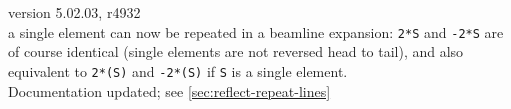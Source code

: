 \begin{madlist}
  
   version 5.02.03, r4932 \\
  a single element can now be repeated in a beamline expansion:
  \texttt{2*S} and \texttt{-2*S} are of course identical (single
  elements are not reversed head to tail), and also equivalent to
  \texttt{2*(S)} and \texttt{-2*(S)} if \texttt{S} is a single
  element.\\
  Documentation updated; see \ref{sec:reflect-repeat-lines}


\end{madlist}
  


\newpage

